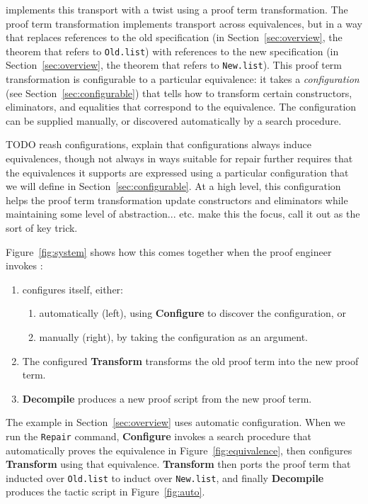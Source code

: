 \toolname implements this transport with a twist using a proof term transformation.
The proof term transformation implements transport across equivalences,
but in a way that replaces references to the old specification (in Section~\ref{sec:overview}, the theorem that refers to \lstinline{Old.list})
with references to the new specification (in Section~\ref{sec:overview}, the theorem that refers to \lstinline{New.list}).
This proof term transformation is configurable to a particular equivalence:
it takes a \textit{configuration} (see Section~\ref{sec:configurable}) 
that tells \toolname how to transform certain constructors, eliminators, and equalities that 
correspond to the equivalence.
The configuration can be supplied manually, or discovered automatically by a search procedure.

TODO reash configurations, explain that configurations always induce equivalences, though not always in ways suitable for repair
\toolname further requires that the equivalences it supports are expressed using a particular configuration that we will define in Section~\ref{sec:configurable}. At a high level, this configuration helps the proof term transformation update constructors and eliminators
while maintaining some level of abstraction... etc. make this the focus, call it out as the sort of key trick.

Figure~\ref{fig:system} shows how this comes together when the proof engineer invokes \toolname:

\begin{enumerate}
\item \toolname configures itself, either:
\begin{enumerate}
\item automatically (left), using \textbf{Configure} to discover the configuration, or
\item manually (right), by taking the configuration as an argument.
\end{enumerate}
\item The configured \textbf{Transform} transforms the old proof term into the new proof term.
\item \textbf{Decompile} produces a new proof script from the new proof term.
\end{enumerate}

The example in Section~\ref{sec:overview} uses automatic configuration. When we run the \lstinline{Repair} command,
\textbf{Configure} invokes a search procedure that automatically proves the equivalence in Figure~\ref{fig:equivalence},
then configures \textbf{Transform} using that equivalence.
\textbf{Transform} then ports the proof term that inducted over \lstinline{Old.list}
to induct over \lstinline{New.list}, and finally
\textbf{Decompile} produces the tactic script in Figure~\ref{fig:auto}.

